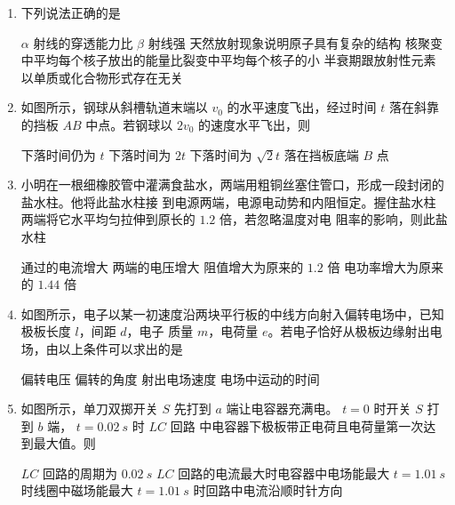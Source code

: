 \begin{enumerate}
\item
下列说法正确的是  


\fourchoices
{$ \alpha $ 射线的穿透能力比 $ \beta $ 射线强}
{天然放射现象说明原子具有复杂的结构}
{核聚变中平均每个核子放出的能量比裂变中平均每个核子的小}
{半衰期跟放射性元素以单质或化合物形式存在无关}

\newpage
\item
如图所示，钢球从斜槽轨道末端以 $ v_{0} $ 的水平速度飞出，经过时间 $ t $ 落在斜靠的挡板 $ AB $ 中点。若钢球以 $ 2 v_{0} $
的速度水平飞出，则  
\begin{figure}[h!]
\centering

\end{figure}

\fourchoices
{下落时间仍为 $ t $}
{下落时间为 $ 2t $}
{下落时间为 $ \sqrt{2} t $}
{落在挡板底端 $ B $ 点}



\item
小明在一根细橡胶管中灌满食盐水，两端用粗铜丝塞住管口，形成一段封闭的盐水柱。他将此盐水柱接
到电源两端，电源电动势和内阻恒定。握住盐水柱两端将它水平均匀拉伸到原长的 $ 1.2 $ 倍，若忽略温度对电
阻率的影响，则此盐水柱  


\fourchoices
{通过的电流增大}
{两端的电压增大}
{阻值增大为原来的 $ 1.2 $ 倍}
{电功率增大为原来的 $ 1.44 $ 倍}


\item
如图所示，电子以某一初速度沿两块平行板的中线方向射入偏转电场中，已知极板长度 $ l $，间距 $ d $，电子
质量 $ m $，电荷量 $ e $。若电子恰好从极板边缘射出电场，由以上条件可以求出的是  
\begin{figure}[h!]
\centering

\end{figure}


\fourchoices
{偏转电压}
{偏转的角度}
{射出电场速度}
{电场中运动的时间}


\item
如图所示，单刀双掷开关 $ S $ 先打到 $ a $ 端让电容器充满电。 $ t=0 $ 时开关 $ S $ 打到 $ b $ 端， $ t=0.02 \ s $ 时 $ LC $ 回路
中电容器下极板带正电荷且电荷量第一次达到最大值。则  
\begin{figure}[h!]
\centering

\end{figure}



\fourchoices
{$ LC $ 回路的周期为 $ 0.02 \ s $}
{$ LC $ 回路的电流最大时电容器中电场能最大}
{$ t=1.01 \ s $ 时线圈中磁场能最大}
{$ t=1.01 \ s $ 时回路中电流沿顺时针方向}



\end{enumerate}
